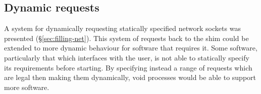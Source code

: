 \documentclass[12pt,a4paper,twoside]{report}
\begin{document}
\subsection{Dynamic requests}

A system for dynamically requesting statically specified network sockets was presented (§\ref{sec:filling-net}). This system of requests back to the shim could be extended to more dynamic behaviour for software that requires it. Some software, particularly that which interfaces with the user, is not able to statically specify its requirements before starting. By specifying instead a range of requests which are legal then making them dynamically, void processes would be able to support more software.

\label{lastcontentpage} %

 


\appendix

\label{lastpage}
\end{document}
